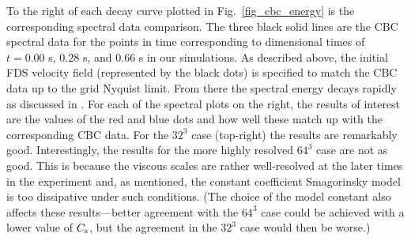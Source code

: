 \documentclass[11pt]{book}
\begin{document}
To the right of each decay curve plotted in Fig.~\ref{fig_cbc_energy} is the corresponding spectral data comparison.  The three black solid lines are the CBC spectral data for the points in time corresponding to dimensional times of $t = 0.00$ s, $0.28$ s, and $0.66$ s in our simulations.  As described above, the initial FDS velocity field (represented by the black dots) is specified to match the CBC data up to the grid Nyquist limit.  From there the spectral energy decays rapidly as discussed in \cite{McDermott:2005b}.  For each of the spectral plots on the right, the results of interest are the values of the red and blue dots and how well these match up with the corresponding CBC data.  For the $32^3$ case (top-right) the results are remarkably good.  Interestingly, the results for the more highly resolved $64^3$ case are not as good.  This is because the viscous scales are rather well-resolved at the later times in the experiment and, as mentioned, the constant coefficient Smagorinsky model is too dissipative under such conditions. (The choice of the model constant also affects these results---better agreement with the $64^3$ case could be achieved with a lower value of $C_{\rm s}$, but the agreement in the $32^3$ case would then be worse.)
\end{document}
